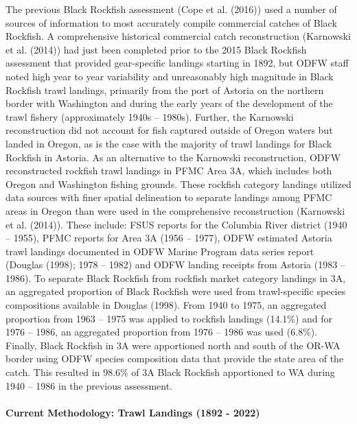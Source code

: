 \documentclass[11pt,
  letterpaper,
]{article}
\begin{document}
The previous Black Rockfish assessment (Cope et al. (2016)) used a number of sources of information to most accurately compile commercial catches of Black Rockfish. A comprehensive historical commercial catch reconstruction (Karnowski et al. (2014)) had just been completed prior to the 2015 Black Rockfish assessment that provided gear-specific landings starting in 1892, but ODFW staff noted high year to year variability and unreasonably high magnitude in Black Rockfish trawl landings, primarily from the port of Astoria on the northern border with Washington and during the early years of the development of the trawl fishery (approximately 1940s -- 1980s). Further, the Karnowski reconstruction did not account for fish captured outside of Oregon waters but landed in Oregon, as is the case with the majority of trawl landings for Black Rockfish in Astoria. As an alternative to the Karnowski reconstruction, ODFW reconstructed rockfish trawl landings in PFMC Area 3A, which includes both Oregon and Washington fishing grounds. These rockfish category landings utilized data sources with finer spatial delineation to separate landings among PFMC areas in Oregon than were used in the comprehensive reconstruction (Karnowski et al. (2014)). These include: FSUS reports for the Columbia River district (1940 -- 1955), PFMC reports for Area 3A (1956 -- 1977), ODFW estimated Astoria trawl landings documented in ODFW Marine Program data series report (Douglas (1998); 1978 -- 1982) and ODFW landing receipts from Astoria (1983 -- 1986). To separate Black Rockfish from rockfish market category landings in 3A, an aggregated proportion of Black Rockfish were used from trawl-specific species compositions available in Douglas (1998). From 1940 to 1975, an aggregated proportion from 1963 -- 1975 was applied to rockfish landings (14.1\%) and for 1976 -- 1986, an aggregated proportion from 1976 -- 1986 was used (6.8\%). Finally, Black Rockfish in 3A were apportioned north and south of the OR-WA border using ODFW species composition data that provide the state area of the catch. This resulted in 98.6\% of 3A Black Rockfish apportioned to WA during 1940 -- 1986 in the previous assessment.

\hypertarget{current-methodology-trawl-landings-1892---2022}{%
\paragraph{Current Methodology: Trawl Landings (1892 - 2022)}\label{current-methodology-trawl-landings-1892---2022}}
\end{document}
